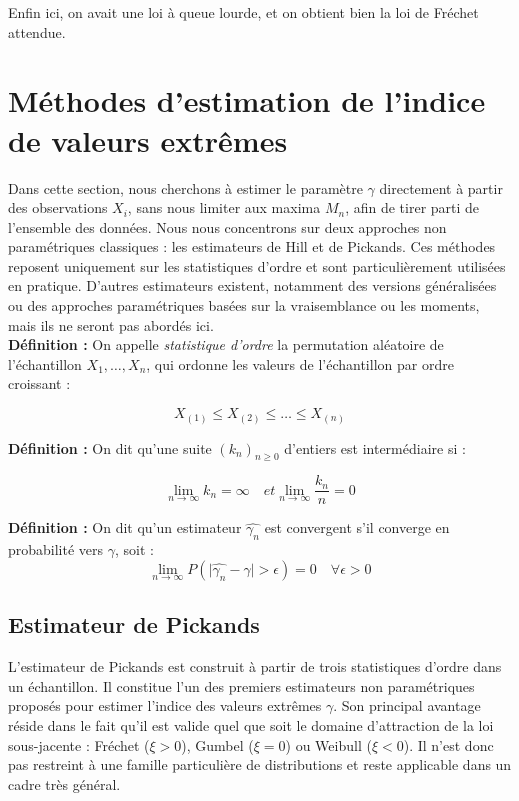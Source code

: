 \documentclass{article}
\theoremstyle{plain}
\theoremstyle{definition}
\theoremstyle{plain}
\begin{document}
\noindent Enfin ici, on avait une loi à queue lourde, et on obtient bien la loi de Fréchet attendue.

\section{Méthodes d'estimation de l'indice de valeurs extrêmes}
Dans cette section, nous cherchons à estimer le paramètre \(\gamma\) directement à partir des observations \(X_i\), sans nous limiter aux maxima \(M_n\), afin de tirer parti de l’ensemble des données.  
Nous nous concentrons sur deux approches non paramétriques classiques : les estimateurs de Hill et de Pickands. Ces méthodes reposent uniquement sur les statistiques d’ordre et sont particulièrement utilisées en pratique. D'autres estimateurs existent, notamment des versions généralisées ou des approches paramétriques basées sur la vraisemblance ou les moments, mais ils ne seront pas abordés ici. \\

\textbf{Définition :} On appelle \textit{statistique d'ordre} la permutation aléatoire de l'échantillon \(X_1, \dots, X_n\), qui ordonne les valeurs de l’échantillon par ordre croissant :

\[
X_{(1)} \leq X_{(2)} \leq \dots \leq X_{(n)}
\]

\textbf{Définition :} On dit qu'une suite \((k_n)_{n \geq 0}\) d'entiers est intermédiaire si :

\[
\lim_{n \to \infty} k_n = \infty \quad et \lim_{n \to \infty} \frac{k_n}{n} = 0
\]

\textbf{Définition :}
On dit qu'un estimateur \(\hat{\gamma_{n}}\) est convergent s'il converge en probabilité vers \(\gamma\), soit :
\[
\lim_{n \to \infty} P(\lvert \hat{\gamma_{n}} - \gamma \rvert > \epsilon) = 0 \quad \forall \epsilon > 0
\]

\subsection{Estimateur de Pickands}

L’estimateur de Pickands est construit à partir de trois statistiques d’ordre dans un échantillon. Il constitue l’un des premiers estimateurs non paramétriques proposés pour estimer l’indice des valeurs extrêmes \(\gamma\). Son principal avantage réside dans le fait qu’il est valide quel que soit le domaine d’attraction de la loi sous-jacente : Fréchet (\(\xi > 0\)), Gumbel (\(\xi = 0\)) ou Weibull (\(\xi < 0\)). Il n'est donc pas restreint à une famille particulière de distributions et reste applicable dans un cadre très général.
\end{document}
